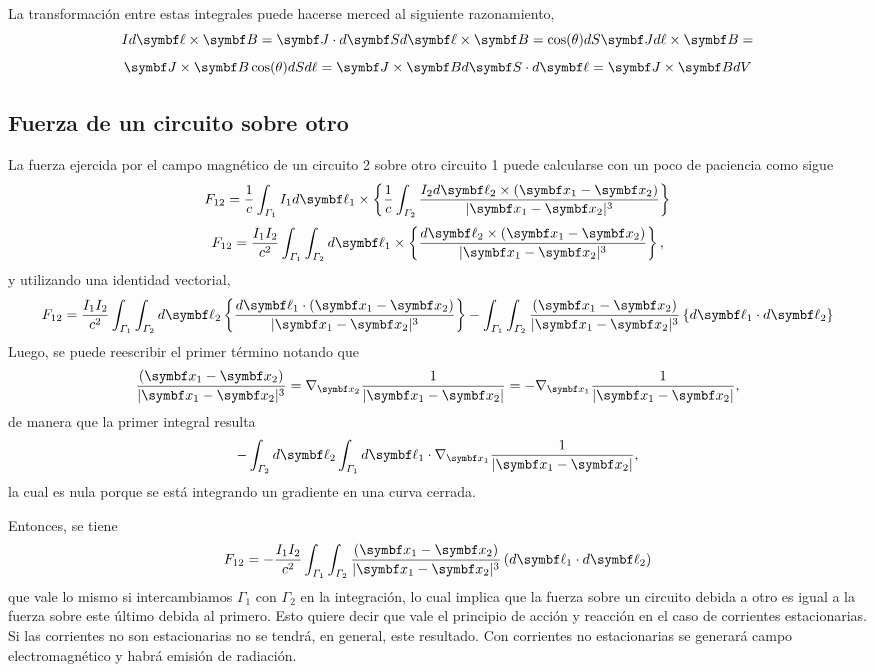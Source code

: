 \documentclass[10pt,oneside]{CBFT_book}
\begin{document}
La transformación entre estas integrales puede hacerse merced al siguiente razonamiento,
\[
  	I d\vb{\ell} \times \vb{B} = \vb{J}  \cdot d\vb{S} d\vb{\ell}  \times \vb{B} =
  	\cos(\theta) dS \vb{J} d\ell \times \vb{B} = 
\]
\[
	\vb{J} \times \vb{B}  \cos(\theta) dS d\ell  = \vb{J} \times \vb{B}  d\vb{S} \cdot d\vb{\ell}  = 
	\vb{J} \times \vb{B}  dV 
\]

\subsection{Fuerza de un circuito sobre otro}

La fuerza ejercida por el campo magnético de un circuito 2 sobre otro circuito 1 puede calcularse con un poco de 
paciencia como sigue
\[
	F_{12} = \frac{1}{c} \int_{\Gamma_1} I_1 d\vb{\ell}_1 \times \left\{
	\frac{1}{c} \int_{\Gamma_2} \frac{I_2 d\vb{\ell}_2 \times (\vb{x}_1 - \vb{x}_2)}{|\vb{x}_1 - \vb{x}_2|^3} 
	\right\}
\]
\[
	F_{12} = \frac{I_1 I_2}{c^2} \int_{\Gamma_1} \int_{\Gamma_2} d\vb{\ell}_1 \times \left\{
	\frac{d\vb{\ell}_2 \times (\vb{x}_1 - \vb{x}_2)}{|\vb{x}_1 - \vb{x}_2|^3} 
	\right\},
\]
y utilizando una identidad vectorial, 
\[
	F_{12} = \frac{I_1 I_2}{c^2} \int_{\Gamma_1} \int_{\Gamma_2} d\vb{\ell}_2  \left\{
	\frac{d\vb{\ell}_1 \cdot (\vb{x}_1 - \vb{x}_2)}{|\vb{x}_1 - \vb{x}_2|^3} 
	\right\} - \int_{\Gamma_1} \int_{\Gamma_2} \frac{ (\vb{x}_1 - \vb{x}_2)}{|\vb{x}_1 - \vb{x}_2|^3} 
	\left\{ d\vb{\ell}_1 \cdot d\vb{\ell}_2 \right\}
\]
Luego, se puede reescribir el primer término notando que 
\[
	\frac{ (\vb{x}_1 - \vb{x}_2)}{|\vb{x}_1 - \vb{x}_2|^3} = 
	\nabla_{\vb{x}_2} \frac{ 1 }{|\vb{x}_1 - \vb{x}_2|} =
	- \nabla_{\vb{x}_1} \frac{ 1 }{|\vb{x}_1 - \vb{x}_2|} ,
\]
de manera que la primer integral resulta 
\[
	- \int_{\Gamma_2} d\vb{\ell}_2 \int_{\Gamma_1} d\vb{\ell}_1 \cdot \nabla_{\vb{x}_1} \frac{ 1 }{|\vb{x}_1 - \vb{x}_2|} ,
\]
la cual es nula porque se está integrando un gradiente en una curva cerrada.

Entonces, se tiene 
\[
	F_{12} = - \frac{I_1 I_2}{c^2} \int_{\Gamma_1} \int_{\Gamma_2} \frac{ (\vb{x}_1 - \vb{x}_2)}{|\vb{x}_1 - \vb{x}_2|^3} 
	\left( d\vb{\ell}_1 \cdot d\vb{\ell}_2 \right)
\]
que vale lo mismo si intercambiamos $\Gamma_1$ con $\Gamma_2$ en la integración, lo cual implica
que la fuerza sobre un circuito debida a otro es igual a la fuerza sobre este último debida al primero.
Esto quiere decir que vale el principio de acción y reacción en el caso de corrientes estacionarias.
Si las corrientes no son estacionarias no se tendrá, en general, este resultado. Con corrientes no
estacionarias se generará campo electromagnético y habrá emisión de radiación.
\end{document}
